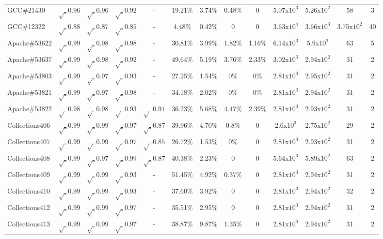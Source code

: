 \begin{table}[h!]
\begin{tabular}{lcccccccccccc}
    GCC\#21430        & $\surd_{0.96}$ & $\surd_{0.96}$ & $\surd_{0.92}$ & - & 19.21\% & 3.74\% & 0.48\% & 0 & 5.07x${10^3}$ & 5.26x${10^2}$ & 58 & 3 \\
    GCC\#12322        & $\surd_{0.88}$ & $\surd_{0.87}$ & $\surd_{0.85}$ & - & 4.48\% & 0.42\% & 0 & 0 & 3.63x${10^4}$ & 3.66x${10^3}$ & 3.75x${10^2}$ & 40 \\
    \midrule
    \midrule
    Apache\#53622     & $\surd_{0.99}$ & $\surd_{0.98}$ & $\surd_{0.98}$ & - & 30.81\% & 3.99\% & 1.82\% & 1.16\% & 6.14x${10^3}$ & 5.9x${10^2}$ & 63 & 5 \\
    Apache\#53637     & $\surd_{0.99}$ & $\surd_{0.98}$ & $\surd_{0.92}$ & - & 49.64\% & 5.19\% & 3.76\% & 2.33\% & 3.02x${10^3}$ & 2.94x${10^2}$ & 31 & 2 \\
    Apache\#53803     & $\surd_{0.99}$ & $\surd_{0.97}$ & $\surd_{0.93}$ & - & 27.25\% & 1.54\% & 0\% & 0\% & 2.81x${10^3}$ & 2.95x${10^2}$ & 31 & 2 \\
    Apache\#53821     & $\surd_{0.99}$ & $\surd_{0.97}$ & $\surd_{0.98}$ & - & 34.18\% & 2.02\% & 0\% & 0\% & 2.81x${10^3}$ & 2.94x${10^2}$ & 31 & 2 \\
    Apache\#53822     & $\surd_{0.98}$ & $\surd_{0.98}$ & $\surd_{0.93}$ & $\surd_{0.91}$ & 36.23\% & 5.68\% & 4.47\% & 2.39\% & 2.81x${10^3}$ & 2.93x${10^2}$ & 31 & 2 \\
    \midrule
    Collections406   & $\surd_{0.99}$ & $\surd_{0.99}$ & $\surd_{0.97}$ & $\surd_{0.87}$ & 39.96\% & 4.70\% & 0.8\% & 0 & 2.6x${10^3}$ & 2.75x${10^2}$ & 29 & 2 \\
    Collections407   & $\surd_{0.99}$ & $\surd_{0.99}$ & $\surd_{0.97}$ & $\surd_{0.85}$ & 26.72\% & 1.53\% & 0\% & 0 & 2.81x${10^3}$ & 2.93x${10^2}$ & 31 & 2 \\
    Collections408   & $\surd_{0.99}$ & $\surd_{0.97}$ & $\surd_{0.99}$ & $\surd_{0.87}$ & 40.38\% & 2.23\% & 0 & 0 & 5.64x${10^3}$ & 5.89x${10^2}$ & 63 & 2 \\
    Collections409   & $\surd_{0.99}$ & $\surd_{0.99}$ & $\surd_{0.93}$ & - & 51.45\% & 4.92\% & 0.37\% & 0 & 2.81x${10^3}$ & 2.94x${10^2}$ & 31 & 2 \\
    Collections410   & $\surd_{0.99}$ & $\surd_{0.99}$ & $\surd_{0.93}$ & - & 37.60\% & 3.92\% & 0 & 0 & 2.81x${10^3}$ & 2.94x${10^2}$ & 32 & 2 \\
    Collections412   & $\surd_{0.99}$ & $\surd_{0.99}$ & $\surd_{0.97}$ & - & 35.51\% & 2.95\% & 0 & 0 & 2.81x${10^3}$ & 2.94x${10^2}$ & 31 & 2 \\
    Collections413   & $\surd_{0.99}$ & $\surd_{0.99}$ & $\surd_{0.97}$ & - & 38.87\% & 9.87\% & 1.35\% & 0 & 2.81x${10^3}$ & 2.94x${10^2}$ & 31 & 2 \\

\end{tabular}
\end{table}
